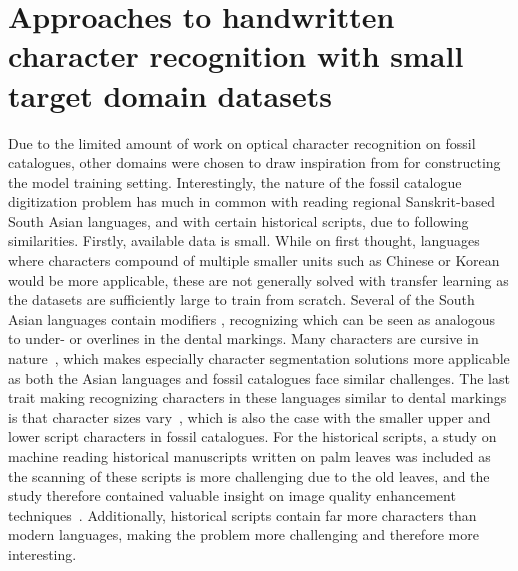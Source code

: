 \documentclass[english,twoside,openright]{UH_DS_MSc}
\begin{document}
\section{Approaches to handwritten character recognition with small target domain datasets}
\label{sect:same_solution}

Due to the limited amount of work on optical character recognition on fossil catalogues, other 
domains were chosen to draw inspiration from for constructing the model training setting. 
Interestingly, the nature of the fossil catalogue digitization problem has much in common with 
reading regional Sanskrit-based South Asian languages, and with certain historical 
scripts, due to following similarities.
Firstly, available data is small. While on first thought, languages where characters compound of
 multiple smaller units such as  Chinese or Korean would be more applicable, these are not
  generally solved with transfer learning as the datasets are sufficiently large to train from scratch.
Several of the South Asian languages contain modifiers \cite{2limbachiyaGujarati,3chatterjeeBengali,5rasheedHandwrittenUrduWAlexNet},
recognizing which can be seen as analogous to under- or overlines in the dental markings.
Many characters are cursive in nature~\cite{5rasheedHandwrittenUrduWAlexNet}, which makes
 especially character segmentation 
solutions more applicable as both the Asian languages and fossil catalogues face similar challenges.
The last trait making recognizing characters in these languages similar to dental markings is that character sizes vary~\cite{6shoponBangla},
which is also the case with the  smaller upper and lower script characters in fossil catalogues.
For the historical scripts, a study on machine reading historical manuscripts written on palm leaves was 
included as the scanning of these scripts is more challenging due to the old leaves, and the 
study therefore contained valuable insight on image quality enhancement techniques~\cite{9thuonPalm}. Additionally, historical scripts 
contain far more characters than modern languages, making the problem more challenging and therefore more interesting.
\end{document}

